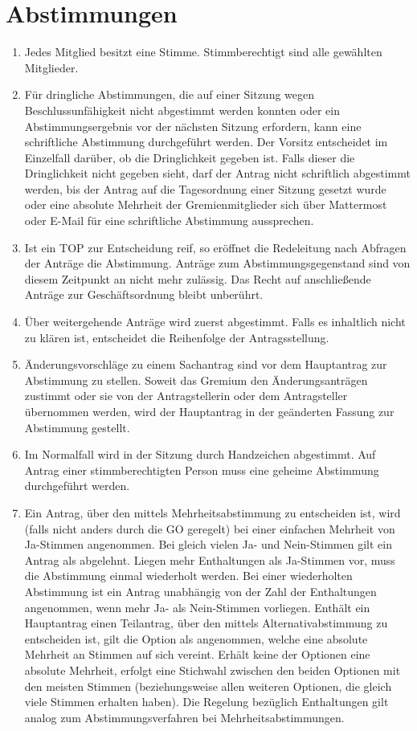 \section{Abstimmungen}
\label{sec:abstimmungen}
\begin{enumerate}
	\item Jedes Mitglied besitzt eine Stimme.
	Stimmberechtigt sind alle gewählten Mitglieder.
	\item \label{item:Sitzungsbeginn} Für dringliche Abstimmungen, die auf einer Sitzung wegen Beschlussunfähigkeit nicht abgestimmt werden konnten oder ein Abstimmungsergebnis vor der nächsten Sitzung erfordern, kann eine schriftliche Abstimmung durchgeführt werden. Der Vorsitz entscheidet im Einzelfall darüber, ob die Dringlichkeit gegeben ist. Falls dieser die Dringlichkeit nicht gegeben sieht, darf der Antrag nicht schriftlich abgestimmt werden, bis der Antrag auf die Tagesordnung einer Sitzung gesetzt wurde oder eine absolute Mehrheit der Gremienmitglieder sich über Mattermost oder E-Mail für eine schriftliche Abstimmung aussprechen.
	\item Ist ein TOP zur Entscheidung reif, so eröffnet die Redeleitung nach Abfragen der Anträge die Abstimmung.
	Anträge zum Abstimmungsgegenstand sind von diesem Zeitpunkt an nicht mehr zulässig.
	Das Recht auf anschließende Anträge zur Geschäftsordnung bleibt unberührt.
	\item Über weitergehende Anträge wird zuerst abgestimmt.
	Falls es inhaltlich nicht zu klären ist, entscheidet die Reihenfolge der Antragsstellung.
	\item Änderungsvorschläge zu einem Sachantrag sind vor dem Hauptantrag zur Abstimmung zu stellen.
	Soweit das Gremium den Änderungsanträgen zustimmt oder sie von der Antragstellerin oder dem Antragsteller übernommen werden, wird der Hauptantrag in der geänderten Fassung zur Abstimmung gestellt.
	\item Im Normalfall wird in der Sitzung durch Handzeichen abgestimmt.
	Auf Antrag einer stimmberechtigten Person muss eine geheime Abstimmung durchgeführt werden.
	\item Ein Antrag, über den mittels Mehrheitsabstimmung zu entscheiden ist, wird (falls nicht anders durch die GO geregelt) bei einer einfachen Mehrheit von Ja-Stimmen angenommen. Bei gleich vielen Ja- und Nein-Stimmen gilt ein Antrag als abgelehnt. Liegen mehr Enthaltungen als Ja-Stimmen vor, muss die Abstimmung einmal wiederholt werden. Bei einer wiederholten Abstimmung ist ein Antrag unabhängig von der Zahl der Enthaltungen angenommen, wenn mehr Ja- als Nein-Stimmen vorliegen. Enthält ein Hauptantrag einen Teilantrag, über den mittels Alternativabstimmung zu entscheiden ist, gilt die Option als angenommen, welche eine absolute Mehrheit an Stimmen auf sich vereint. Erhält keine der Optionen eine absolute Mehrheit, erfolgt eine Stichwahl zwischen den beiden Optionen mit den meisten Stimmen (beziehungsweise allen weiteren Optionen, die gleich viele Stimmen erhalten haben). Die Regelung bezüglich Enthaltungen gilt analog zum Abstimmungsverfahren bei Mehrheitsabstimmungen.
	\label{item:abstimmungsmodus}
\end{enumerate}

